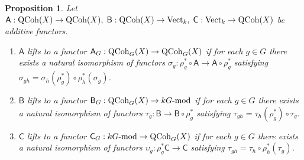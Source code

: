 \documentclass[10pt]{amsart}
\newtheorem{proposition}[theorem]{Proposition}
\theoremstyle{definition}
\begin{document}
\begin{proposition}\label{prop:G-functors}
Let 
$
\mathsf{A}:{\rm QCoh}(X)\rightarrow {\rm QCoh}(X), \;\mathsf{B}:{\rm QCoh}(X)\rightarrow {\rm Vect}_k,\;\mathsf{C}:{\rm Vect}_k\rightarrow {\rm QCoh}(X)
$
be additive functors.
\begin{enumerate}
\item
$\mathsf{A}$ lifts to a functor $\mathsf{A}_G:{\rm QCoh}_G(X)\rightarrow {\rm QCoh}_G(X)$ if for each $g\in G$ there exists a natural isomorphism of functors $\sigma_g:\rho_g^*\circ \mathsf{A}\rightarrow \mathsf{A}\circ \rho_g^* $ satisfying $\sigma_{gh}=\sigma_h(\rho^*_g)\circ \rho_h^*(\sigma_g)$.\\

\item $\mathsf{B}$ lifts to a functor $\mathsf{B}_G:{\rm QCoh}_G(X)\rightarrow kG\text{-}{\rm mod}$ if for each $g\in G$ there exists a natural isomorphism of functors $\tau_g:\mathsf{B}\rightarrow \mathsf{B}\circ\rho^*_g$ satisfying $\tau_{gh}=\tau_h(\rho_g^*)\circ\tau_g$.\\

\item $\mathsf{C}$ lifts to a functor $\mathsf{C}_G:kG\text{-}{\rm mod}\rightarrow {\rm QCoh}_G(X)$ if for each $g\in G$ there exists a natural isomorphism of functors $\upsilon_g:\rho_g^*\mathsf{C}\rightarrow \mathsf{C}$ satisfying $\tau_{gh}=\tau_h\circ\rho_h^*(\tau_g)$.
\end{enumerate}
\end{proposition}
\end{document}
